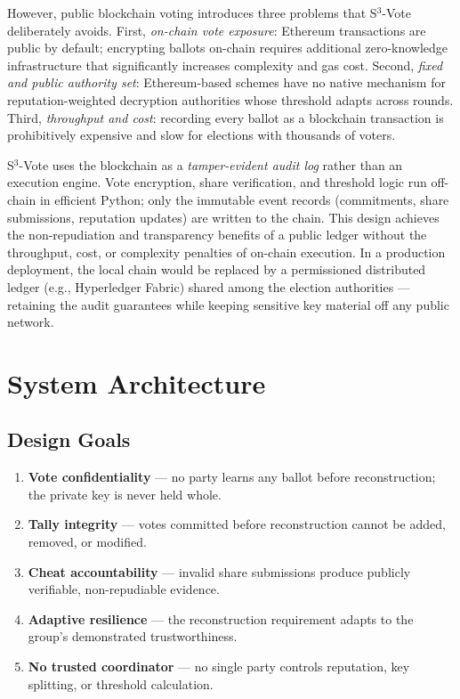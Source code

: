 \documentclass[12pt,a4paper]{article}
\theoremstyle{definition}
\theoremstyle{remark}
\begin{document}
However, public blockchain voting introduces three problems that
S$^3$-Vote deliberately avoids.
First, \emph{on-chain vote exposure}: Ethereum transactions are public
by default; encrypting ballots on-chain requires additional zero-knowledge
infrastructure that significantly increases complexity and gas cost.
Second, \emph{fixed and public authority set}: Ethereum-based schemes
have no native mechanism for reputation-weighted decryption authorities
whose threshold adapts across rounds.
Third, \emph{throughput and cost}: recording every ballot as a
blockchain transaction is prohibitively expensive and slow for elections
with thousands of voters.

S$^3$-Vote uses the blockchain as a \emph{tamper-evident audit log}
rather than an execution engine.
Vote encryption, share verification, and threshold logic run
off-chain in efficient Python; only the immutable event records
(commitments, share submissions, reputation updates) are written
to the chain.
This design achieves the non-repudiation and transparency benefits
of a public ledger without the throughput, cost, or complexity
penalties of on-chain execution.
In a production deployment, the local chain would be replaced by a
permissioned distributed ledger (e.g., Hyperledger Fabric) shared
among the election authorities — retaining the audit guarantees
while keeping sensitive key material off any public network.

\section{System Architecture}
\label{sec:architecture}

\subsection{Design Goals}

\begin{enumerate}[label=\textbf{G\arabic*.}]
  \item \textbf{Vote confidentiality} — no party learns any ballot before
    reconstruction; the private key is never held whole.
  \item \textbf{Tally integrity} — votes committed before reconstruction
    cannot be added, removed, or modified.
  \item \textbf{Cheat accountability} — invalid share submissions produce
    publicly verifiable, non-repudiable evidence.
  \item \textbf{Adaptive resilience} — the reconstruction requirement adapts
    to the group's demonstrated trustworthiness.
  \item \textbf{No trusted coordinator} — no single party controls
    reputation, key splitting, or threshold calculation.
\end{enumerate}
\end{document}
